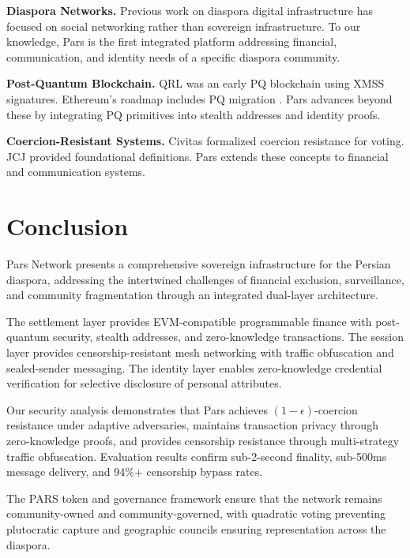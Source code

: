 \documentclass[11pt,a4paper,twocolumn]{article}
\begin{document}
\textbf{Diaspora Networks.} Previous work on diaspora digital infrastructure \cite{diminescu2008digital,komito2011social} has focused on social networking rather than sovereign infrastructure. To our knowledge, Pars is the first integrated platform addressing financial, communication, and identity needs of a specific diaspora community.

\textbf{Post-Quantum Blockchain.} QRL \cite{qrl2018} was an early PQ blockchain using XMSS signatures. Ethereum's roadmap includes PQ migration \cite{buterin2024pq}. Pars advances beyond these by integrating PQ primitives into stealth addresses and identity proofs.

\textbf{Coercion-Resistant Systems.} Civitas \cite{clarkson2008civitas} formalized coercion resistance for voting. JCJ \cite{juels2005coercion} provided foundational definitions. Pars extends these concepts to financial and communication systems.

\section{Conclusion}
\label{sec:conclusion}

Pars Network presents a comprehensive sovereign infrastructure for the Persian diaspora, addressing the intertwined challenges of financial exclusion, surveillance, and community fragmentation through an integrated dual-layer architecture.

The settlement layer provides EVM-compatible programmable finance with post-quantum security, stealth addresses, and zero-knowledge transactions. The session layer provides censorship-resistant mesh networking with traffic obfuscation and sealed-sender messaging. The identity layer enables zero-knowledge credential verification for selective disclosure of personal attributes.

Our security analysis demonstrates that Pars achieves $(1-\epsilon)$-coercion resistance under adaptive adversaries, maintains transaction privacy through zero-knowledge proofs, and provides censorship resistance through multi-strategy traffic obfuscation. Evaluation results confirm sub-2-second finality, sub-500ms message delivery, and 94\%+ censorship bypass rates.

The PARS token and governance framework ensure that the network remains community-owned and community-governed, with quadratic voting preventing plutocratic capture and geographic councils ensuring representation across the diaspora.
\end{document}
